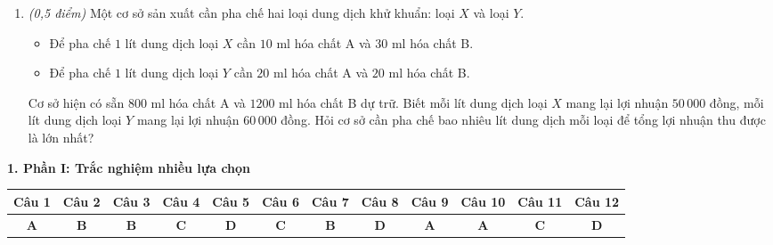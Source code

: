 \documentclass[12pt,a4paper]{article}
\newcommand{\parttitle}[1]{\par\vspace{2pt}{\large\bfseries\color{ink}#1}\par\vspace{1pt}}
\begin{document}
\begin{enumerate}[resume]
\begin{minipage}[t]{0.38\linewidth}
\end{minipage}

\item \textit{(0,5 điểm)} Một cơ sở sản xuất cần pha chế hai loại dung dịch khử khuẩn: loại $X$ và loại $Y$.
\begin{itemize}[leftmargin=0.5cm]
    \item Để pha chế $1$ lít dung dịch loại $X$ cần $10\text{ ml}$ hóa chất A và $30\text{ ml}$ hóa chất B.
    \item Để pha chế $1$ lít dung dịch loại $Y$ cần $20\text{ ml}$ hóa chất A và $20\text{ ml}$ hóa chất B.
\end{itemize}
Cơ sở hiện có sẵn $800\text{ ml}$ hóa chất A và $1200\text{ ml}$ hóa chất B dự trữ. Biết mỗi lít dung dịch loại $X$ mang lại lợi nhuận $50\,000$ đồng, mỗi lít dung dịch loại $Y$ mang lại lợi nhuận $60\,000$ đồng. Hỏi cơ sở cần pha chế bao nhiêu lít dung dịch mỗi loại để tổng lợi nhuận thu được là lớn nhất?
\end{enumerate}

\newpage
\parttitle{BẢNG ĐÁP ÁN TỔNG HỢP}

\vspace{0.2cm}
\textbf{1. Phần I: Trắc nghiệm nhiều lựa chọn}
\begin{center}
{\setlength{\tabcolsep}{2.5pt}\small
\begin{tabular}{|c|c|c|c|c|c|c|c|c|c|c|c|}
\hline
\textbf{Câu 1} & \textbf{Câu 2} & \textbf{Câu 3} & \textbf{Câu 4} & \textbf{Câu 5} & \textbf{Câu 6} & \textbf{Câu 7} & \textbf{Câu 8} & \textbf{Câu 9} & \textbf{Câu 10} & \textbf{Câu 11} & \textbf{Câu 12} \\
\hline
\textbf{A} & \textbf{B} & \textbf{B} & \textbf{C} & \textbf{D} & \textbf{C} & \textbf{B} & \textbf{D} & \textbf{A} & \textbf{A} & \textbf{C} & \textbf{D} \\
\hline
\end{tabular}}
\end{center}
\end{document}

